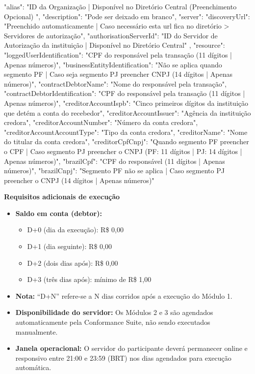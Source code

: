 \begin{codeblock}
{
    "alias": "ID da Organização | Disponível no Diretório Central (Preenchimento Opcional) ",
    "description": "Pode ser deixado em branco",
    "server": {
        "discoveryUrl": "Preenchido automaticamente | Caso necessário esta url fica no diretório > Servidores de autorização",
        "authorisationServerId": "ID do Servidor de Autorização da instituição | Disponível no Diretório Central"
    },
    "resource": {
        "loggedUserIdentification": "CPF do responsável pela transação (11 dígitos | Apenas números)",
        "businessEntityIdentification": "Não se aplica quando segmento PF | Caso seja segmento PJ preencher CNPJ (14 dígitos | Apenas números)",
        "contractDebtorName": "Nome do responsável pela transação",
        "contractDebtorIdentification": "CPF do responsável pela transação (11 dígitos | Apenas números)",
        "creditorAccountIspb": "Cinco primeiros dígitos da instituição que detém a conta do recebedor",
        "creditorAccountIssuer": "Agência da instituição credora",
        "creditorAccountNumber": "Número da conta credora",
        "creditorAccountAccountType": "Tipo da conta credora",
        "creditorName": "Nome do titular da conta credora",
        "creditorCpfCnpj": "Quando segmento PF preencher o CPF | Caso segmento PJ preencher o CNPJ (PF: 11 dígitos | PJ: 14 dígitos | Apenas números)",
        "brazilCpf": "CPF do responsável (11 dígitos | Apenas números)",
        "brazilCnpj": "Segmento PF não se aplica | Caso segmento PJ preencher o CNPJ (14 dígitos | Apenas números)"
    }
}
\end{codeblock}

\textbf{Requisitos adicionais de execução}

\begin{itemize}
    \item \textbf{Saldo em conta (debtor):}
    \begin{itemize}
        \item D+0 (dia da execução): R\$ 0,00
        \item D+1 (dia seguinte): R\$ 0,00
        \item D+2 (dois dias após): R\$ 0,00
        \item D+3 (três dias após): mínimo de R\$ 1,00
    \end{itemize}
    \item \textbf{Nota:} ``D+N'' refere-se a N dias corridos após a execução do Módulo 1.
    \item \textbf{Disponibilidade do servidor:} Os Módulos 2 e 3 são agendados automaticamente pela Conformance Suite, não sendo executados manualmente.
    \item \textbf{Janela operacional:} O servidor do participante deverá permanecer online e responsivo entre 21:00 e 23:59 (BRT) nos dias agendados para execução automática.
\end{itemize}

